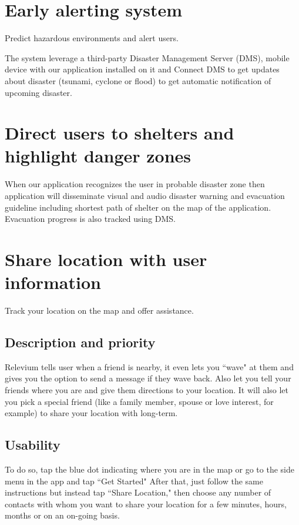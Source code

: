 \documentclass{scrreprt}
\begin{document}
\newpage
\section{Early alerting system}
Predict hazardous environments and alert users.

The system leverage a third-party Disaster Management Server (DMS), mobile device with our application installed on it and Connect DMS to get updates about disaster (tsunami, cyclone or flood) to get automatic notification of upcoming disaster.


\section{Direct users to shelters and highlight danger zones}


When our application recognizes the user in probable disaster zone then application will disseminate visual and audio disaster warning and evacuation guideline including shortest path of shelter on the map of the application. Evacuation progress is also tracked using DMS.



\section{Share location with user information}
Track your location on the map and offer assistance.


\subsection{Description and priority}
Relevium tells user when a friend is nearby, it even lets you ``wave" at them and gives you the option to send a message if they wave back. Also let you tell your friends where you are and give them directions to your location. It will also let you pick a special friend (like a family member, spouse or love interest, for example) to share your location with long-term.

\subsection{Usability}

To do so, tap the blue dot indicating where you are in the map or go to the side menu in the app and tap ``Get Started" After that, just follow the same instructions but instead tap ``Share Location," then choose any number of contacts with whom you want to share your location for a few minutes, hours, months or on an on-going basis.
\end{document}
